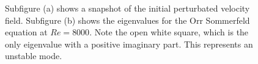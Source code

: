 \begin{figure}
 \centering
 \caption{Subfigure (a) shows a snapshot of the initial perturbated velocity field. Subfigure (b) shows the eigenvalues for the Orr Sommerfeld equation at $Re=8000$. Note the open white square, which is the only eigenvalue with a positive imaginary part. This represents an unstable mode.}
 \label{fig:OS_init}
\end{figure}

